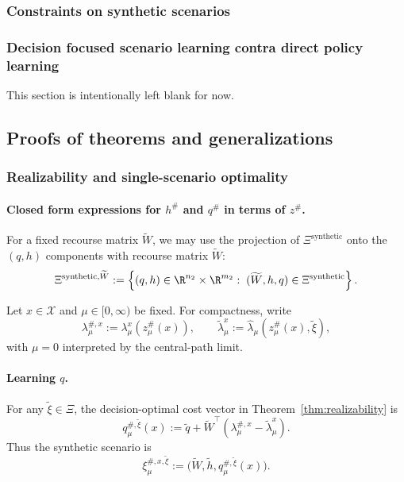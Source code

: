 \subsubsection{Constraints on synthetic scenarios}
\label{app:synthetic-scenario-constraints}

\subsubsection{Decision focused scenario learning contra direct policy learning}
\label{app:dfl-vs-direct}

This section is intentionally left blank for now.

\subsection{Proofs of theorems and generalizations}
\label{app:proofs-generalizations}

\subsubsection{Realizability and single-scenario optimality}
\label{app:realizability}

\paragraph{Closed form expressions for $h^\#$ and $q^\#$ in terms of $z^\#$.}
\label{app:realizability-proof-extended}

For a fixed recourse matrix $\widetilde W$, we may use the projection of $\Xi^{\mathrm{synthetic}}$ onto the $(q,h)$ components with recourse matrix $\widetilde W$:
\begin{equation}
\label{eq:appendix-Xi-synthetic-W}
\Xi^{\mathrm{synthetic},\widetilde W}
:=
\left\{
(q,h)\in\R^{n_2}\times\R^{m_2}:\;(\widetilde W,h,q)\in \Xi^{\mathrm{synthetic}}
\right\}.
\end{equation}

Let $x\in\mathcal X$ and $\mu\in[0,\infty)$ be fixed. For compactness, write
\[
\lambda_\mu^{\#,x}:=\lambda_\mu^{x}(z_\mu^\#(x)),
\qquad
\tilde\lambda_\mu^{x}:=\hat\lambda_\mu(z_\mu^\#(x),\tilde\xi),
\]
with $\mu=0$ interpreted by the central-path limit.

\paragraph{Learning $q$.}
For any $\tilde\xi\in\Xi$, the decision-optimal cost vector in Theorem~\ref{thm:realizability} is
\begin{equation}
\label{eq:q-construct}
q_\mu^{\#,\tilde\xi}(x)
:=
\tilde q+\tilde W^\top\!\left(\lambda_\mu^{\#,x}-\tilde\lambda_\mu^{x}\right).
\end{equation}
Thus the synthetic scenario is
\begin{equation}
\label{eq:q-scenario-appendix}
\xi_\mu^{\#,x,\tilde\xi}
:=
\bigl(\tilde W,\tilde h,q_\mu^{\#,\tilde\xi}(x)\bigr).
\end{equation}

